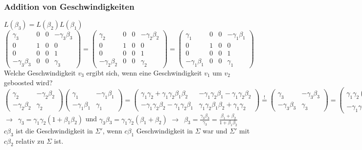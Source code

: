 \documentclass[oneside]{book}
\theoremstyle{definition}
\newcommand{\conseq}{$\rightarrow$~}
\begin{document}
\subsubsection{Addition von Geschwindigkeiten}
$L(\beta_3) = L(\beta_2) L(\beta_1)$\\
$\begin{pmatrix}
\gamma_3 & 0 & 0 &- \gamma_3 \beta_3\\
0 & 1 & 0 & 0\\
0 & 0 & 0 & 1\\
- \gamma_3 \beta_3 & 0 & 0 & \gamma_3
\end{pmatrix} = \begin{pmatrix}
	\gamma_2 & 0 & 0 &- \gamma_2 \beta_2\\
	0 & 1 & 0 & 0\\
	0 & 0 & 0 & 1\\
	- \gamma_2 \beta_2 & 0 & 0 & \gamma_2
\end{pmatrix} = \begin{pmatrix}
	\gamma_1 & 0 & 0 &- \gamma_1 \beta_1\\
	0 & 1 & 0 & 0\\
	0 & 0 & 0 & 1\\
	- \gamma_1 \beta_1 & 0 & 0 & \gamma_1
\end{pmatrix}$
Welche Geschwindigkeit $v_3$ ergibt sich, wenn eine Geschwindigkeit $v_1$ um $v_2$ geboosted wird?
$\begin{pmatrix}
	\gamma_2 & -\gamma_2 \beta_2\\
	- \gamma_2 \beta_2 & \gamma_2
\end{pmatrix} \begin{pmatrix}
\gamma_1 & - \gamma_1 \beta_1\\
-\gamma_1 \beta_1 & \gamma_1
\end{pmatrix} = \begin{pmatrix}
\gamma_1 \gamma_2 + \gamma_1 \gamma_2 \beta_1 \beta_2 & - \gamma_1 \gamma_2 \beta_1 - \gamma_1 \gamma_2 \beta_2\\
- \gamma_1 \gamma_2 \beta_2 - \gamma_1 \gamma_2 \beta_1 & \gamma_1 \gamma_2 \beta_1 \beta_2 + \gamma_1 \gamma_2
\end{pmatrix} \overset{!}{=} \begin{pmatrix}
\gamma_3 & -\gamma_3 \beta_3\\
- \gamma_3 \beta_3 & \gamma_3
\end{pmatrix} = \begin{pmatrix}
\gamma_1 \gamma_2 (1 + \beta_1 \beta_2) & - \gamma_1 \gamma_2 (\beta_1 + \beta_2)\\
- \gamma_1 \gamma_2 (\beta_1 + \beta_2) & \gamma_1 \gamma_2 (1 + \beta_1 \beta_2)
\end{pmatrix}$
\conseq $\gamma_3 = \gamma_1 \gamma_2 (1 + \beta_1 \beta_2)$ und $\gamma_3 \beta_3 = \gamma_1 \gamma_2 (\beta_1 + \beta_2)$ \conseq $\beta_3 = \frac{\gamma_3 \beta_3}{\gamma_3} = \frac{\beta_1 + \beta_2}{1 + \beta_1 \beta_2}$\\
$c \beta_3$ ist die Geschwindigkeit in $\Sigma'$, wenn $c\beta_1$ Geschwindigkeit in $\Sigma$ war und $\Sigma'$ mit $c\beta_2$ relativ zu $\Sigma$ ist.
\end{document}
